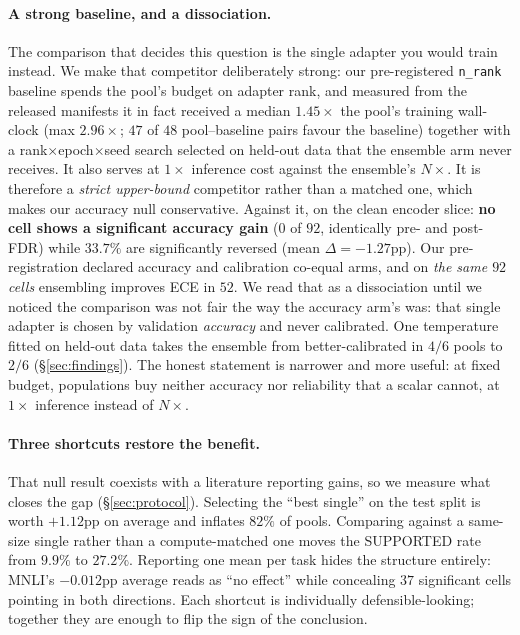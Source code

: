 \documentclass[11pt]{article}
\begin{document}
\paragraph{A strong baseline, and a dissociation.} The comparison that decides this question is the single adapter you would train instead. We make that competitor deliberately strong: our pre-registered \texttt{n\_rank} baseline spends the pool's budget on adapter rank, and measured from the released manifests it in fact received a median $1.45\times$ the pool's training wall-clock (max $2.96\times$; $47$ of $48$ pool--baseline pairs favour the baseline) together with a rank$\times$epoch$\times$seed search selected on held-out data that the ensemble arm never receives. It also serves at $1\times$ inference cost against the ensemble's $N\times$. It is therefore a \emph{strict upper-bound} competitor rather than a matched one, which makes our accuracy null conservative. Against it, on the clean encoder slice: \textbf{no cell shows a significant accuracy gain} ($0$ of $92$, identically pre- and post-FDR) while $33.7\%$ are significantly reversed (mean $\Delta{=}{-}1.27$pp). Our pre-registration declared accuracy and calibration co-equal arms, and on \emph{the same $92$ cells} ensembling improves ECE in $52$. We read that as a dissociation until we noticed the comparison was not fair the way the accuracy arm's was: that single adapter is chosen by validation \emph{accuracy} and never calibrated. One temperature fitted on held-out data takes the ensemble from better-calibrated in $4/6$ pools to $2/6$ (\S\ref{sec:findings}). The honest statement is narrower and more useful: at fixed budget, populations buy neither accuracy nor reliability that a scalar cannot, at $1\times$ inference instead of $N\times$.

\paragraph{Three shortcuts restore the benefit.} That null result coexists with a literature reporting gains, so we measure what closes the gap (\S\ref{sec:protocol}). Selecting the ``best single'' on the test split is worth $+1.12$pp on average and inflates $82\%$ of pools. Comparing against a same-size single rather than a compute-matched one moves the SUPPORTED rate from $9.9\%$ to $27.2\%$. Reporting one mean per task hides the structure entirely: MNLI's $-0.012$pp average reads as ``no effect'' while concealing $37$ significant cells pointing in both directions. Each shortcut is individually defensible-looking; together they are enough to flip the sign of the conclusion.
\end{document}
